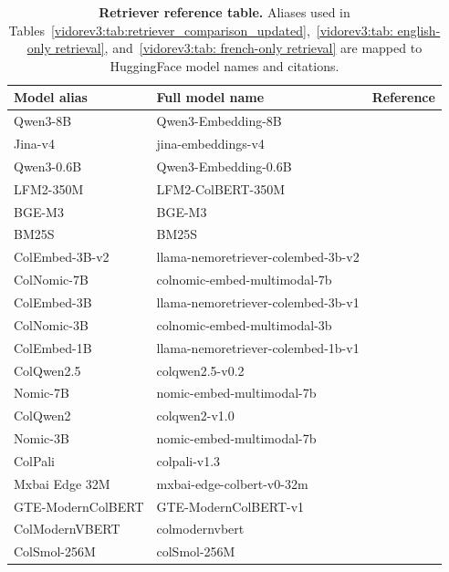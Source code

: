 \begin{table}[ht]
\centering
\begin{tabular}{lll}
\toprule
\textbf{Model alias} & \textbf{Full model name} & \textbf{Reference} \\ \midrule
Qwen3-8B & Qwen3-Embedding-8B & \cite{zhang2025qwen3embeddingadvancingtext} \\
Jina-v4 & jina-embeddings-v4 & \cite{günther2025jinaembeddingsv4universalembeddingsmultimodal} \\
Qwen3-0.6B & Qwen3-Embedding-0.6B & \cite{zhang2025qwen3embeddingadvancingtext} \\
LFM2-350M & LFM2-ColBERT-350M & \cite{liquidai2025lfm2} \\
BGE-M3 & BGE-M3 & \cite{chen_bge_2024} \\
BM25S & BM25S & \cite{bm25s} \\
ColEmbed-3B-v2 & llama-nemoretriever-colembed-3b-v2 & \cite{xu2025llamanemoretrievercolembedtopperforming} \\ %
ColNomic-7B & colnomic-embed-multimodal-7b & \cite{nomicembedmultimodal2025} \\
ColEmbed-3B & llama-nemoretriever-colembed-3b-v1 & \cite{xu2025llamanemoretrievercolembedtopperforming} \\
ColNomic-3B & colnomic-embed-multimodal-3b & \cite{nomicembedmultimodal2025} \\
ColEmbed-1B & llama-nemoretriever-colembed-1b-v1 & \cite{xu2025llamanemoretrievercolembedtopperforming} \\
ColQwen2.5 & colqwen2.5-v0.2 & \cite{faysse2025colpaliefficientdocumentretrieval} \\
Nomic-7B & nomic-embed-multimodal-7b & \cite{nomicembedmultimodal2025} \\
ColQwen2 & colqwen2-v1.0 & \cite{faysse2025colpaliefficientdocumentretrieval} \\
Nomic-3B & nomic-embed-multimodal-7b & \cite{nomicembedmultimodal2025} \\
ColPali & colpali-v1.3 & \cite{faysse2025colpaliefficientdocumentretrieval} \\
Mxbai Edge 32M & mxbai-edge-colbert-v0-32m & \cite{takehi2025fantasticsmallretrieverstrain} \\
GTE-ModernColBERT & GTE-ModernColBERT-v1 & \cite{GTE-ModernColBERT} \\
ColModernVBERT & colmodernvbert & \cite{teiletche2025modernvbert} \\
ColSmol-256M & colSmol-256M & \cite{marafioti2025smolvlmredefiningsmallefficient} \\
\bottomrule
\end{tabular}
\caption[Retriever aliases and model references]{\textbf{Retriever reference table.} Aliases used in Tables~\ref{vidorev3:tab:retriever_comparison_updated},~\ref{vidorev3:tab: english-only retrieval}, and~\ref{vidorev3:tab: french-only retrieval} are mapped to HuggingFace model names and citations.}
\label{vidorev3:tab:model_metadata}
\end{table}

